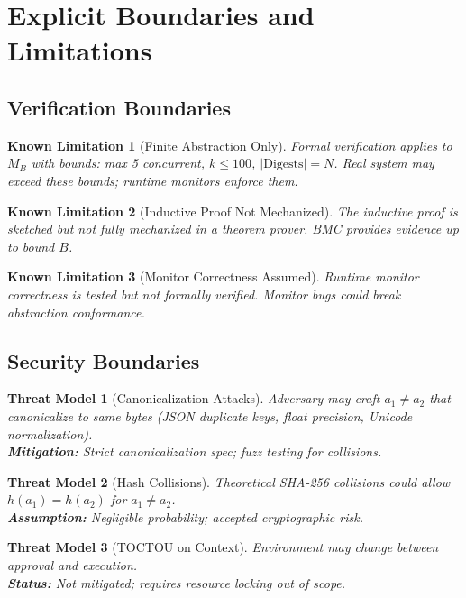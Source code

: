 \documentclass[12pt]{article}
\newtheorem{threat}{Threat Model}[section]
\newtheorem{limitation}{Known Limitation}[section]
\begin{document}
\section{Explicit Boundaries and Limitations}

\subsection{Verification Boundaries}

\begin{limitation}[Finite Abstraction Only]
Formal verification applies to $M_B$ with bounds: max 5 concurrent, $k \leq 100$, $|\mathrm{Digests}| = N$. Real system may exceed these bounds; runtime monitors enforce them.
\end{limitation}

\begin{limitation}[Inductive Proof Not Mechanized]
The inductive proof is sketched but not fully mechanized in a theorem prover. BMC provides evidence up to bound $B$.
\end{limitation}

\begin{limitation}[Monitor Correctness Assumed]
Runtime monitor correctness is tested but not formally verified. Monitor bugs could break abstraction conformance.
\end{limitation}

\subsection{Security Boundaries}

\begin{threat}[Canonicalization Attacks]
Adversary may craft $a_1 \neq a_2$ that canonicalize to same bytes (JSON duplicate keys, float precision, Unicode normalization).\\
\textbf{Mitigation:} Strict canonicalization spec; fuzz testing for collisions.
\end{threat}

\begin{threat}[Hash Collisions]
Theoretical SHA-256 collisions could allow $h(a_1) = h(a_2)$ for $a_1 \neq a_2$.\\
\textbf{Assumption:} Negligible probability; accepted cryptographic risk.
\end{threat}

\begin{threat}[TOCTOU on Context]
Environment may change between approval and execution.\\
\textbf{Status:} Not mitigated; requires resource locking out of scope.
\end{threat}
\end{document}
